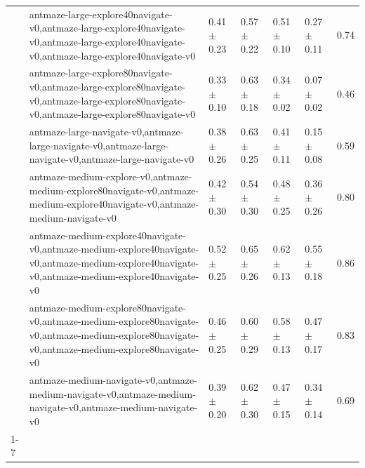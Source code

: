 \begin{tabular}{lllllll}
 & antmaze-large-explore40navigate-v0,antmaze-large-explore40navigate-v0,antmaze-large-explore40navigate-v0,antmaze-large-explore40navigate-v0 & 0.41 $\pm$ 0.23 & 0.57 $\pm$ 0.22 & 0.51 $\pm$ 0.10 & 0.27 $\pm$ 0.11 & 0.74 \\
 & antmaze-large-explore80navigate-v0,antmaze-large-explore80navigate-v0,antmaze-large-explore80navigate-v0,antmaze-large-explore80navigate-v0 & 0.33 $\pm$ 0.10 & 0.63 $\pm$ 0.18 & 0.34 $\pm$ 0.02 & 0.07 $\pm$ 0.02 & 0.46 \\
 & antmaze-large-navigate-v0,antmaze-large-navigate-v0,antmaze-large-navigate-v0,antmaze-large-navigate-v0 & 0.38 $\pm$ 0.26 & 0.63 $\pm$ 0.25 & 0.41 $\pm$ 0.11 & 0.15 $\pm$ 0.08 & 0.59 \\
 & antmaze-medium-explore-v0,antmaze-medium-explore80navigate-v0,antmaze-medium-explore40navigate-v0,antmaze-medium-navigate-v0 & 0.42 $\pm$ 0.30 & 0.54 $\pm$ 0.30 & 0.48 $\pm$ 0.25 & 0.36 $\pm$ 0.26 & 0.80 \\
 & antmaze-medium-explore40navigate-v0,antmaze-medium-explore40navigate-v0,antmaze-medium-explore40navigate-v0,antmaze-medium-explore40navigate-v0 & 0.52 $\pm$ 0.25 & 0.65 $\pm$ 0.26 & 0.62 $\pm$ 0.13 & 0.55 $\pm$ 0.18 & 0.86 \\
 & antmaze-medium-explore80navigate-v0,antmaze-medium-explore80navigate-v0,antmaze-medium-explore80navigate-v0,antmaze-medium-explore80navigate-v0 & 0.46 $\pm$ 0.25 & 0.60 $\pm$ 0.29 & 0.58 $\pm$ 0.13 & 0.47 $\pm$ 0.17 & 0.83 \\
 & antmaze-medium-navigate-v0,antmaze-medium-navigate-v0,antmaze-medium-navigate-v0,antmaze-medium-navigate-v0 & 0.39 $\pm$ 0.20 & 0.62 $\pm$ 0.30 & 0.47 $\pm$ 0.15 & 0.34 $\pm$ 0.14 & 0.69 \\
\cline{1-7}
\bottomrule
\end{tabular}
